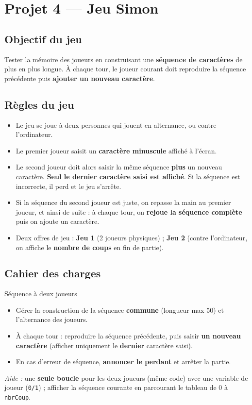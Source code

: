 \section{Projet 4 — Jeu Simon}
\setcounter{UPSTInumeroCahier des charges}{0}

\subsection*{Objectif du jeu}
Tester la mémoire des joueurs en construisant une \textbf{séquence de caractères} de plus en plus longue. À chaque tour, le joueur courant doit reproduire la séquence précédente puis \textbf{ajouter un nouveau caractère}.

\subsection*{Règles du jeu}
\begin{itemize}
  \item Le jeu se joue à deux personnes qui jouent en alternance, ou contre l’ordinateur.
  \item Le premier joueur saisit un \textbf{caractère minuscule} affiché à l’écran.
  \item Le second joueur doit alors saisir la même séquence \textbf{plus} un nouveau caractère. \textbf{Seul le dernier caractère saisi est affiché}. Si la séquence est incorrecte, il perd et le jeu s’arrête.
  \item Si la séquence du second joueur est juste, on repasse la main au premier joueur, et ainsi de suite : à chaque tour, on \textbf{rejoue la séquence complète} puis on ajoute un caractère.
  \item Deux offres de jeu : \textbf{Jeu 1} (2 joueurs physiques) ; \textbf{Jeu 2} (contre l’ordinateur, on affiche le \textbf{nombre de coups} en fin de partie).
\end{itemize}

\subsection*{Cahier des charges}
\begin{UPSTICahierDesCharges}{Séquence à deux joueurs}
\begin{itemize}
  \item Gérer la construction de la séquence \textbf{commune} (longueur max 50) et l’alternance des joueurs.
  \item À chaque tour : reproduire la séquence précédente, puis saisir \textbf{un nouveau caractère} (afficher uniquement le \textbf{dernier} caractère saisi).
  \item En cas d’erreur de séquence, \textbf{annoncer le perdant} et arrêter la partie.
\end{itemize}
\textit{Aide :} une \textbf{seule boucle} pour les deux joueurs (même code) avec une variable de joueur (\texttt{0/1}) ; afficher la séquence courante en parcourant le tableau de 0 à \texttt{nbrCoup}.
\end{UPSTICahierDesCharges}


